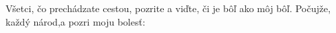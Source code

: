 Všetci, čo prechádzate cestou, pozrite a viďte,
\versseparator
či je bôľ ako môj bôľ.
\versseparator
Počujže, každý národ,a pozri moju bolesť: